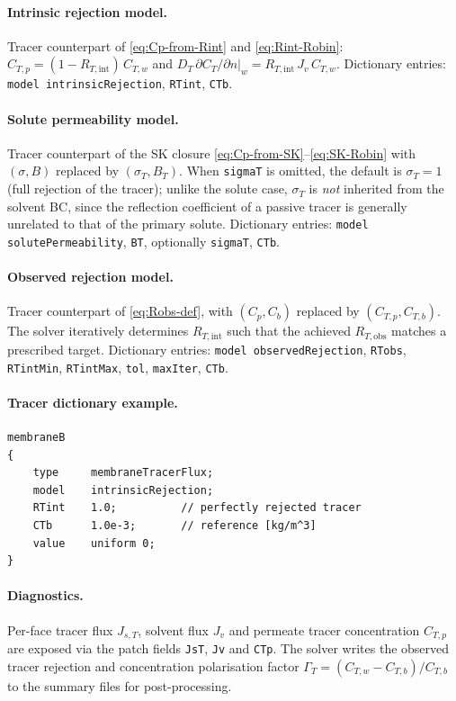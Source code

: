 \documentclass[11pt,a4paper]{article}
\begin{document}
\paragraph{Intrinsic rejection model.}
Tracer counterpart of \eqref{eq:Cp-from-Rint} and
\eqref{eq:Rint-Robin}: \(C_{T,p} = (1 - R_{T,\mathrm{int}})\,C_{T,w}\)
and \(D_T\,\partial C_T/\partial n|_{w} = R_{T,\mathrm{int}}\,J_v\,C_{T,w}\).
Dictionary entries: \texttt{model intrinsicRejection},
\texttt{RTint}, \texttt{CTb}.

\paragraph{Solute permeability model.}
Tracer counterpart of the SK closure
\eqref{eq:Cp-from-SK}--\eqref{eq:SK-Robin} with \((\sigma, B)\)
replaced by \((\sigma_T, B_T)\). When \texttt{sigmaT} is omitted, the
default is \(\sigma_T = 1\) (full rejection of the tracer); unlike
the solute case, \(\sigma_T\) is \emph{not} inherited from the
solvent BC, since the reflection coefficient of a passive tracer is
generally unrelated to that of the primary solute. Dictionary
entries: \texttt{model solutePermeability}, \texttt{BT}, optionally
\texttt{sigmaT}, \texttt{CTb}.

\paragraph{Observed rejection model.}
Tracer counterpart of \eqref{eq:Robs-def}, with \((C_p, C_b)\)
replaced by \((C_{T,p}, C_{T,b})\). The solver iteratively determines
\(R_{T,\mathrm{int}}\) such that the achieved
\(R_{T,\mathrm{obs}}\) matches a prescribed target. Dictionary
entries: \texttt{model observedRejection}, \texttt{RTobs},
\texttt{RTintMin}, \texttt{RTintMax}, \texttt{tol}, \texttt{maxIter},
\texttt{CTb}.

\paragraph{Tracer dictionary example.}
\begin{verbatim}
membraneB
{
    type     membraneTracerFlux;
    model    intrinsicRejection;
    RTint    1.0;          // perfectly rejected tracer
    CTb      1.0e-3;       // reference [kg/m^3]
    value    uniform 0;
}
\end{verbatim}

\paragraph{Diagnostics.}
Per-face tracer flux \(J_{s,T}\), solvent flux \(J_v\) and permeate tracer concentration \(C_{T,p}\) are exposed via the patch fields \texttt{JsT}, \texttt{Jv} and \texttt{CTp}.  The solver writes the observed tracer rejection and concentration polarisation factor \(\Gamma_T = (C_{T,w}-C_{T,b})/C_{T,b}\) to the summary files for post-processing.
\end{document}
